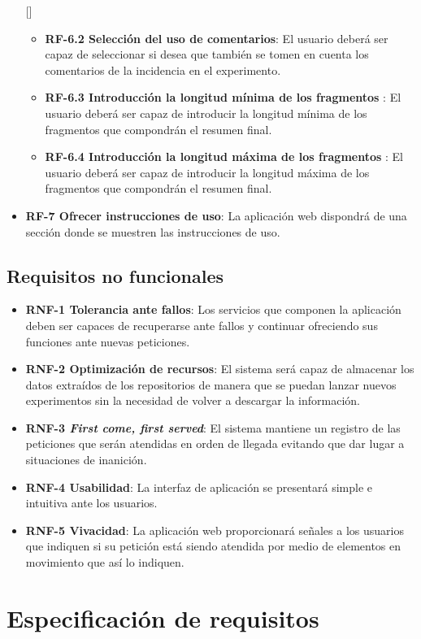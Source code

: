 \begin{itemize} [\textbullet]
\begin{itemize} [\textbullet]
        \item \textbf{RF-6.2 Selección del uso de comentarios}: El usuario deberá ser capaz de seleccionar si desea que también se tomen en cuenta los comentarios de la incidencia en el experimento.
        \item \textbf{RF-6.3 Introducción la longitud mínima de los fragmentos }: El usuario deberá ser capaz de introducir la longitud mínima de los fragmentos que compondrán el resumen final.
        \item \textbf{RF-6.4 Introducción la longitud máxima de los fragmentos }: El usuario deberá ser capaz de introducir la longitud máxima de los fragmentos que compondrán el resumen final.
    \end{itemize}
    \item \textbf{RF-7 Ofrecer instrucciones de uso}: La aplicación web dispondrá de una sección donde se muestren las instrucciones de uso.
\end{itemize}

\subsection{Requisitos no funcionales}

\begin{itemize} [\textbullet]
    \item \textbf{RNF-1 Tolerancia ante fallos}: Los servicios que componen la aplicación deben ser capaces de recuperarse ante fallos y continuar ofreciendo sus funciones ante nuevas peticiones.
    \item \textbf{RNF-2 Optimización de recursos}: El sistema será capaz de almacenar los datos extraídos de los repositorios de manera que se puedan lanzar nuevos experimentos sin la necesidad de volver a descargar la información.
    \item \textbf{RNF-3 \emph{First come, first served}}: El sistema mantiene un registro de las peticiones que serán atendidas en orden de llegada evitando que dar lugar a situaciones de inanición.
    \item \textbf{RNF-4 Usabilidad}: La interfaz de aplicación se presentará simple e intuitiva ante los usuarios.
    \item \textbf{RNF-5 Vivacidad}: La aplicación web proporcionará señales a los usuarios que indiquen si su petición está siendo atendida por medio de elementos en movimiento que así lo indiquen.
\end{itemize}

\section{Especificación de requisitos}

